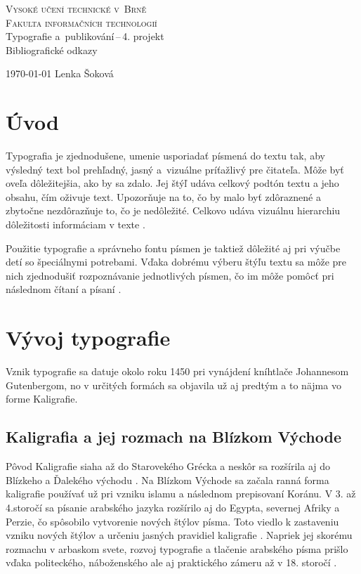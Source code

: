 \documentclass[11pt, a4paper]{article}
\begin{document}
\begin{titlepage}
\begin{center}
\Huge
\textsc {Vysoké učení technické v~Brně}\\
\huge
\textsc {Fakulta informačních technologií}\\
    \LARGE {Typografie a~publikování\,--\,4. projekt}\\
    \Huge {Bibliografické odkazy}
\end{center}

{\Large
\today
\hfill Lenka Šoková }
\end{titlepage}


\section{Úvod}
Typografia je zjednodušene, umenie usporiadať písmená do textu tak, aby výsledný text bol prehľadný, jasný a~vizuálne príťažlivý pre čitateľa. Môže byť oveľa dôležitejšia, ako by sa zdalo. Jej štýľ udáva celkový podtón textu a jeho obsahu, čím oživuje text. Upozorňuje na to, čo by malo byť zdôraznené a zbytočne nezdôrazňuje to, čo je nedôležité. Celkovo udáva vizuálnu hierarchiu dôležitosti informáciam v texte {\cite{Hannah2020}}.

Použitie typografie a správneho fontu písmen je taktiež dôležité aj pri výučbe detí so špeciálnymi potrebami. Vďaka dobrému výberu štýľu textu sa môže pre nich zjednodušiť rozpoznávanie jednotlivých písmen, čo im môže pomôcť pri následnom čítaní a písaní {\cite{Beard2019}}.


\section{Vývoj typografie}
Vznik typografie sa datuje okolo roku 1450 pri vynájdení kníhtlače Johannesom Gutenbergom, no v určitých formách sa objavila už aj predtým a to näjma vo forme Kaligrafie.

\subsection{Kaligrafia a jej rozmach na Blízkom Východe}
Pôvod Kaligrafie siaha až do Starovekého Grécka a neskôr sa rozšírila aj do Blízkeho a Ďalekého východu {\cite{Clayton}}. Na Blízkom Východe sa začala ranná forma kaligrafie používať už pri vzniku islamu a následnom prepisovaní Koránu. V 3. až 4.storočí sa písanie arabského jazyka rozšírilo aj do Egypta, severnej Afriky a Perzie, čo spôsobilo vytvorenie nových štýlov písma. Toto viedlo k zastaveniu vzniku nových štýlov a určeniu jasných pravidiel kaligrafie {\cite{Yusofi1990}}. Napriek jej skorému rozmachu v arbaskom svete, rozvoj typografie a tlačenie arabského písma prišlo vďaka politeckého, náboženského ale aj praktického zámeru až v 18. storočí {\cite{Kampman2011}}.
\end{document}
